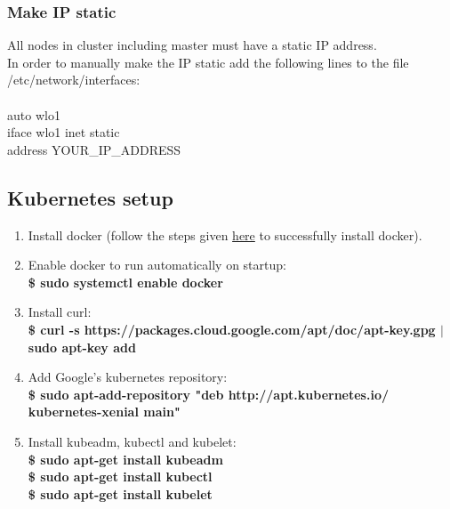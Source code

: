 \documentclass[12pt]{report}
\begin{document}
\subsubsection{Make IP static}
All nodes in cluster including master must have a static IP address.\\
In order to manually make the IP static add the following lines to the file /etc/network/interfaces:\\\\
auto wlo1\\
iface wlo1 inet static\\
address  YOUR\_IP\_ADDRESS
\subsection{Kubernetes setup}
\begin{enumerate}
	\item Install docker (follow the steps given \hyperref[sec:dockerinstall]{here} to successfully install docker).
	\item Enable docker to run automatically on startup:\\
	\textbf{\$ sudo systemctl enable docker}
	\item Install curl:\\
	\textbf{\$ curl -s https://packages.cloud.google.com/apt/doc/apt-key.gpg $\vert$ sudo apt-key add}
	\item Add Google’s kubernetes repository:\\
	\textbf{\$ sudo apt-add-repository "deb http://apt.kubernetes.io/ kubernetes-xenial main"}
	\item Install kubeadm, kubectl and kubelet:\\
	\textbf{\$ sudo apt-get install kubeadm}\\
	\textbf{\$ sudo apt-get install kubectl}\\
	\textbf{\$ sudo apt-get install kubelet}
\end{enumerate}
\end{document}
